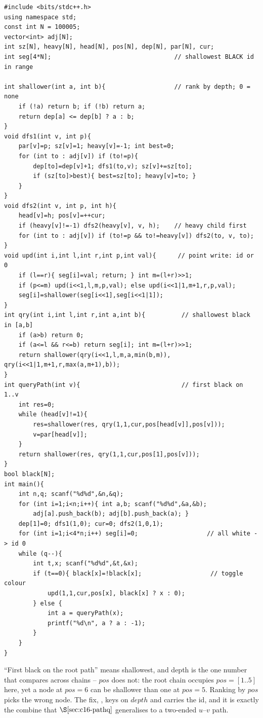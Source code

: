 \begin{lstlisting}[caption={SPOJ QTREE3: heavy-light build + a segment tree over pos that keeps the shallowest black id in each range; colour toggle is a point write, root-path query folds O(log n) ranges}, label={lst:c16-qtree3}]
#include <bits/stdc++.h>
using namespace std;
const int N = 100005;
vector<int> adj[N];
int sz[N], heavy[N], head[N], pos[N], dep[N], par[N], cur;
int seg[4*N];                                  // shallowest BLACK id in range

int shallower(int a, int b){                   // rank by depth; 0 = none
    if (!a) return b; if (!b) return a;
    return dep[a] <= dep[b] ? a : b;
}
void dfs1(int v, int p){
    par[v]=p; sz[v]=1; heavy[v]=-1; int best=0;
    for (int to : adj[v]) if (to!=p){
        dep[to]=dep[v]+1; dfs1(to,v); sz[v]+=sz[to];
        if (sz[to]>best){ best=sz[to]; heavy[v]=to; }
    }
}
void dfs2(int v, int p, int h){
    head[v]=h; pos[v]=++cur;
    if (heavy[v]!=-1) dfs2(heavy[v], v, h);    // heavy child first
    for (int to : adj[v]) if (to!=p && to!=heavy[v]) dfs2(to, v, to);
}
void upd(int i,int l,int r,int p,int val){      // point write: id or 0
    if (l==r){ seg[i]=val; return; } int m=(l+r)>>1;
    if (p<=m) upd(i<<1,l,m,p,val); else upd(i<<1|1,m+1,r,p,val);
    seg[i]=shallower(seg[i<<1],seg[i<<1|1]);
}
int qry(int i,int l,int r,int a,int b){          // shallowest black in [a,b]
    if (a>b) return 0;
    if (a<=l && r<=b) return seg[i]; int m=(l+r)>>1;
    return shallower(qry(i<<1,l,m,a,min(b,m)), qry(i<<1|1,m+1,r,max(a,m+1),b));
}
int queryPath(int v){                            // first black on 1..v
    int res=0;
    while (head[v]!=1){
        res=shallower(res, qry(1,1,cur,pos[head[v]],pos[v]));
        v=par[head[v]];
    }
    return shallower(res, qry(1,1,cur,pos[1],pos[v]));
}
bool black[N];
int main(){
    int n,q; scanf("%d%d",&n,&q);
    for (int i=1;i<n;i++){ int a,b; scanf("%d%d",&a,&b);
        adj[a].push_back(b); adj[b].push_back(a); }
    dep[1]=0; dfs1(1,0); cur=0; dfs2(1,0,1);
    for (int i=1;i<4*n;i++) seg[i]=0;                   // all white -> id 0
    while (q--){
        int t,x; scanf("%d%d",&t,&x);
        if (t==0){ black[x]=!black[x];                   // toggle colour
            upd(1,1,cur,pos[x], black[x] ? x : 0);
        } else {
            int a = queryPath(x);
            printf("%d\n", a ? a : -1);
        }
    }
}
\end{lstlisting}

\begin{warningbox}
``First black on the root path'' means shallowest, and depth is the one number that compares across chains -- \(\mathit{pos}\) does not: the root chain occupies \(\mathit{pos}=[1..5]\) here, yet a node at \(\mathit{pos}=6\) can be shallower than one at \(\mathit{pos}=5\). Ranking by \(\mathit{pos}\) picks the wrong node. The fix, , keys on \(\mathit{depth}\) and carries the id, and it is exactly the combine that \(\secref{c16-pathq}\) generalises to a two-ended \(u\)--\(v\) path.
\end{warningbox}

